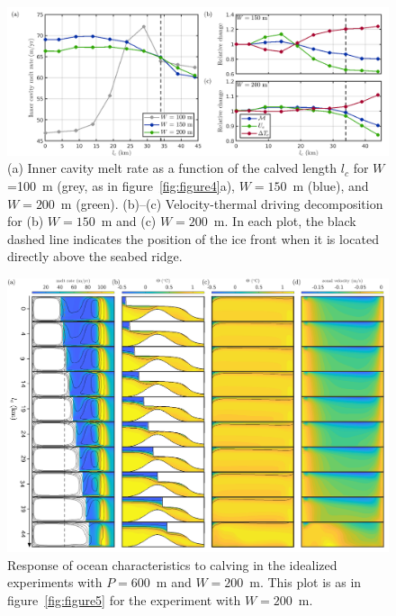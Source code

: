 \documentclass[draft]{agujournal2019}
\begin{document}
\begin{figure}
    \centering
    \includegraphics[width = \textwidth]{../make_figures/plots/figure6.png}
    \caption{(a) Inner cavity melt rate as a function of the calved length $l_c$ for $W$=100~m (grey, as in figure~\ref{fig:figure4}a), $W=150$~m (blue), and $W=200$~m (green).  (b)--(c) Velocity-thermal driving decomposition for (b) $W = 150$~m and (c) $W = 200$~m. In each plot, the black dashed line indicates the position of the ice front when it is located directly above the seabed ridge.}
    \label{fig:figure6}
\end{figure}

\begin{figure}
    \centering
    \includegraphics[width = \textwidth]{../make_figures/plots/figure7.pdf}
    \caption{Response of ocean characteristics to calving in the idealized experiments with $P=600$~m and $W=200$~m. This plot is as in figure~\ref{fig:figure5} for the experiment with $W=200$~m.}
    \label{fig:figure7}
\end{figure}
\end{document}
